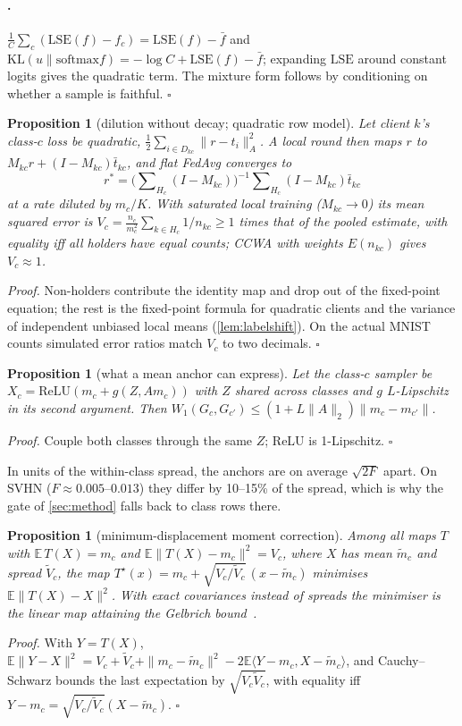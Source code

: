 \documentclass[10pt]{article}
\theoremstyle{plain}
\newtheorem{proposition}[theorem]{Proposition}
\theoremstyle{definition}
\newcommand{\E}{\mathbb{E}}
\newcommand{\LSE}{\mathrm{LSE}}
\newcommand{\KL}{\mathrm{KL}}
\begin{document}
\paragraph{.} $\frac1C\sum_c(\LSE(f)-f_c)=\LSE(f)-\bar f$ and $\KL(u\|\mathrm{softmax}f)=-\log
C+\LSE(f)-\bar f$; expanding $\LSE$ around constant logits gives the quadratic term. The mixture form follows by
conditioning on whether a sample is faithful. \hfill$\square$

\begin{proposition}[dilution without decay; quadratic row model]\label{prop:dilution}
Let client $k$'s class-$c$ loss be quadratic, $\frac12\sum_{i\in D_{kc}}\|r-t_i\|_A^2$. A local round then maps
$r$ to $M_{kc}r+(I-M_{kc})\bar t_{kc}$, and flat FedAvg converges to
\[r^*=\Big(\sum\nolimits_{H_c}(I-M_{kc})\Big)^{-1}\sum\nolimits_{H_c}(I-M_{kc})\bar t_{kc}\]
at a rate diluted by $m_c/K$. With saturated local training ($M_{kc}\to0$) its mean squared error is
$V_c=\frac{n_c}{m_c^2}\sum_{k\in H_c}1/n_{kc}\ge1$ times that of the pooled estimate, with equality iff all holders
have equal counts; CCWA with weights $E(n_{kc})$ gives $V_c\approx1$.
\end{proposition}
\emph{Proof.} Non-holders contribute the identity map and drop out of the fixed-point equation; the rest is the
fixed-point formula for quadratic clients and the variance of independent unbiased local means (\cref{lem:labelshift}).
On the actual MNIST counts simulated error ratios match $V_c$ to two decimals. \hfill$\square$

\begin{proposition}[what a mean anchor can express]\label{prop:w1}
Let the class-$c$ sampler be $X_c=\mathrm{ReLU}(m_c+g(Z,Am_c))$ with $Z$ shared across classes and $g$ $L$-Lipschitz
in its second argument. Then $W_1(G_c,G_{c'})\le(1+L\|A\|_2)\|m_c-m_{c'}\|$.
\end{proposition}
\emph{Proof.} Couple both classes through the same $Z$; ReLU is 1-Lipschitz. \hfill$\square$

In units of the within-class spread, the anchors are on average $\sqrt{2F}$ apart. On SVHN ($F\approx0.005$--$0.013$)
they differ by 10--15\% of the spread, which is why the gate of \cref{sec:method} falls back to class rows there.

\begin{proposition}[minimum-displacement moment correction]\label{prop:mc}
Among all maps $T$ with $\E\,T(X)=m_c$ and $\E\|T(X)-m_c\|^2=V_c$, where $X$ has mean $\tilde m_c$ and spread $\tilde V_c$,
the map $T^\star(x)=m_c+\sqrt{V_c/\tilde V_c}\,(x-\tilde m_c)$ minimises $\E\|T(X)-X\|^2$. With exact covariances
instead of spreads the minimiser is the linear map attaining the Gelbrich bound~\cite{gelbrich1990}.
\end{proposition}
\emph{Proof.} With $Y=T(X)$, $\E\|Y-X\|^2=V_c+\tilde V_c+\|m_c-\tilde m_c\|^2-2\E\langle Y-m_c,X-\tilde m_c\rangle$, and
Cauchy--Schwarz bounds the last expectation by $\sqrt{V_c\tilde V_c}$, with equality iff $Y-m_c=\sqrt{V_c/\tilde
V_c}(X-\tilde m_c)$. \hfill$\square$
\end{document}
